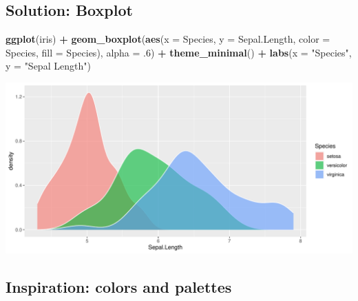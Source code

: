 \documentclass[
]{book}
\newenvironment{Shaded}{\begin{snugshade}}{\end{snugshade}}
\newcommand{\AttributeTok}[1]{\textcolor[rgb]{0.13,0.29,0.53}{#1}}
\newcommand{\DecValTok}[1]{\textcolor[rgb]{0.00,0.00,0.81}{#1}}
\newcommand{\FunctionTok}[1]{\textcolor[rgb]{0.13,0.29,0.53}{\textbf{#1}}}
\newcommand{\NormalTok}[1]{#1}
\newcommand{\SpecialCharTok}[1]{\textcolor[rgb]{0.81,0.36,0.00}{\textbf{#1}}}
\newcommand{\StringTok}[1]{\textcolor[rgb]{0.31,0.60,0.02}{#1}}
\begin{document}
\subsection{Solution: Boxplot}\label{solution-boxplot}

\begin{Shaded}
\begin{Highlighting}[]
\FunctionTok{ggplot}\NormalTok{(iris) }\SpecialCharTok{+} 
  \FunctionTok{geom\_boxplot}\NormalTok{(}\FunctionTok{aes}\NormalTok{(}\AttributeTok{x =}\NormalTok{ Species, }\AttributeTok{y =}\NormalTok{ Sepal.Length,}
                   \AttributeTok{color =}\NormalTok{ Species, }\AttributeTok{fill =}\NormalTok{ Species), }\AttributeTok{alpha =}\NormalTok{ .}\DecValTok{6}\NormalTok{) }\SpecialCharTok{+}
  \FunctionTok{theme\_minimal}\NormalTok{() }\SpecialCharTok{+} \FunctionTok{labs}\NormalTok{(}\AttributeTok{x =} \StringTok{"Species"}\NormalTok{, }\AttributeTok{y =} \StringTok{"Sepal Length"}\NormalTok{)}
\end{Highlighting}
\end{Shaded}

\begin{flushleft}\includegraphics{_main_files/figure-latex/unnamed-chunk-52-1} \end{flushleft}

\subsection{Inspiration: colors and palettes}\label{inspiration-colors-and-palettes}
\end{document}

